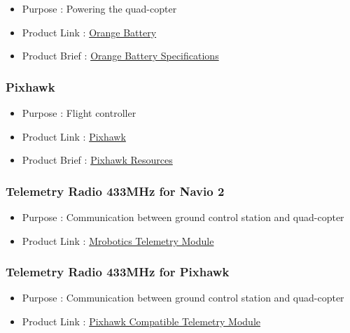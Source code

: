 \documentclass[a4paper,12pt,oneside]{book}
\begin{document}
\begin{itemize}
  \item Purpose : Powering the quad-copter
  \item Product Link : \href{https://robu.in/product/orange-11-1v-6200mah-3s-40c-lipo-battery-pack-xt60-connector/}{Orange Battery} 
  \item Product Brief : \href{https://robu.in/product/orange-11-1v-6200mah-3s-40c-lipo-battery-pack-xt60-connector/}{Orange Battery Specifications} 
 \end{itemize}
 
  \subsubsection{Pixhawk} 
\begin{itemize}
  \item Purpose : Flight controller
  \item Product Link : \href{https://robokits.co.in/drones-quad-hexa-octa-fpv/flight-controllers/pixhawk-px4-2.4.8-32bit-flight-controller-with-imp.-accessories}{Pixhawk} 
  \item Product Brief : \href{https://pixhawk.org/}{Pixhawk Resources} 
 \end{itemize}
 
\subsubsection{Telemetry Radio 433MHz for Navio 2 } 

\begin{itemize}
  \item Purpose : Communication between ground control station and quad-copter 
  \item Product Link : \href{https://store.mrobotics.io/mRo-SiK-Telemetry-Radio-V2-433Mhz-p/mro-433sikv2-mr.htm}{Mrobotics Telemetry Module} 
 \end{itemize}

\subsubsection{Telemetry Radio 433MHz for Pixhawk } 

\begin{itemize}
  \item Purpose : Communication between ground control station and quad-copter 
  \item Product Link : \href{https://robokits.co.in/drones-quad-hexa-octa-fpv/fpv-video-telemetry-osd/433mhz-telemetry-module-pair-for-pixhawk-and-apm-100mw-2km-range}{Pixhawk Compatible Telemetry Module} 
   \end{itemize}
 
\end{document}
